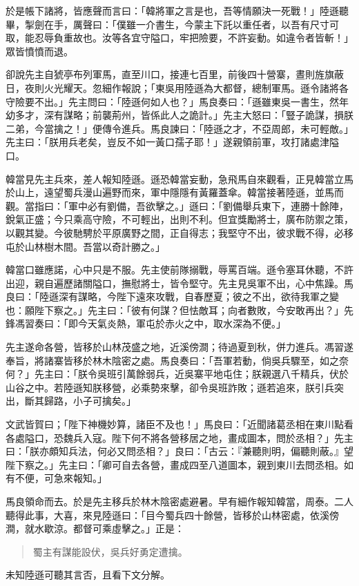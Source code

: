 於是帳下諸將，皆應聲而言曰：「韓將軍之言是也，吾等情願決一死戰！」陸遜聽畢，掣劍在手，厲聲曰：「僕雖一介書生，今蒙主下託以重任者，以吾有尺寸可取，能忍辱負重故也。汝等各宜守隘口，牢把險要，不許妄動。如違令者皆斬！」眾皆憤憤而退。

卻說先主自猇亭布列軍馬，直至川口，接連七百里，前後四十營寨，晝則旌旗蔽日，夜則火光耀天。忽細作報說；「東吳用陸遜為大都督，總制軍馬。遜令諸將各守險要不出。」先主問曰：「陸遜何如人也？」馬良奏曰：「遜雖東吳一書生，然年幼多才，深有謀略；前襲荊州，皆係此人之詭計。」先主大怒曰：「豎子詭謀，損朕二弟，今當擒之！」便傳令進兵。馬良諫曰：「陸遜之才，不亞周郎，未可輕敵。」先主曰：「朕用兵老矣，豈反不如一黃口孺子耶！」遂親領前軍，攻打諸處津隘口。

韓當見先主兵來，差人報知陸遜。遜恐韓當妄動，急飛馬自來觀看，正見韓當立馬於山上，遠望蜀兵漫山遍野而來，軍中隱隱有黃羅蓋傘。韓當接著陸遜，並馬而觀。當指曰：「軍中必有劉備，吾欲擊之。」遜曰：「劉備舉兵東下，連勝十餘陣，銳氣正盛；今只乘高守險，不可輕出，出則不利。但宜獎勵將士，廣布防禦之策，以觀其變。今彼馳騁於平原廣野之間，正自得志；我堅守不出，彼求戰不得，必移屯於山林樹木間。吾當以奇計勝之。」

韓當口雖應諾，心中只是不服。先主使前隊搦戰，辱罵百端。遜令塞耳休聽，不許出迎，親自遍歷諸關隘口，撫慰將士，皆令堅守。先主見吳軍不出，心中焦躁。馬良曰：「陸遜深有謀略，今陛下遠來攻戰，自春歷夏；彼之不出，欲待我軍之變也：願陛下察之。」先主曰：「彼有何謀？但怯敵耳；向者數敗，今安敢再出？」先鋒馮習奏曰：「即今天氣炎熱，軍屯於赤火之中，取水深為不便。」

先主遂命各營，皆移於山林茂盛之地，近溪傍澗；待過夏到秋，併力進兵。馮習遂奉旨，將諸寨皆移於林木陰密之處。馬良奏曰：「吾軍若動，倘吳兵驟至，如之奈何？」先主曰：「朕令吳班引萬餘弱兵，近吳寨平地屯住；朕親選八千精兵，伏於山谷之中。若陸遜知朕移營，必乘勢來擊，卻令吳班詐敗；遜若追來，朕引兵突出，斷其歸路，小子可擒矣。」

文武皆賀曰；「陛下神機妙算，諸臣不及也！」馬良曰：「近聞諸葛丞相在東川點看各處隘口，恐魏兵入寇。陛下何不將各營移居之地，畫成圖本，問於丞相？」先主曰：「朕亦頗知兵法，何必又問丞相？」良曰：「古云：『兼聽則明，偏聽則蔽。』望陛下察之。」先主曰：「卿可自去各營，畫成四至八道圖本，親到東川去問丞相。如有不便，可急來報知。」

馬良領命而去。於是先主移兵於林木陰密處避暑。早有細作報知韓當，周泰。二人聽得此事，大喜，來見陸遜曰：「目今蜀兵四十餘營，皆移於山林密處，依溪傍澗，就水歇涼。都督可乘虛擊之。」正是：

\begin{quote}
蜀主有謀能設伏，吳兵好勇定遭擒。
\end{quote}

未知陸遜可聽其言否，且看下文分解。
